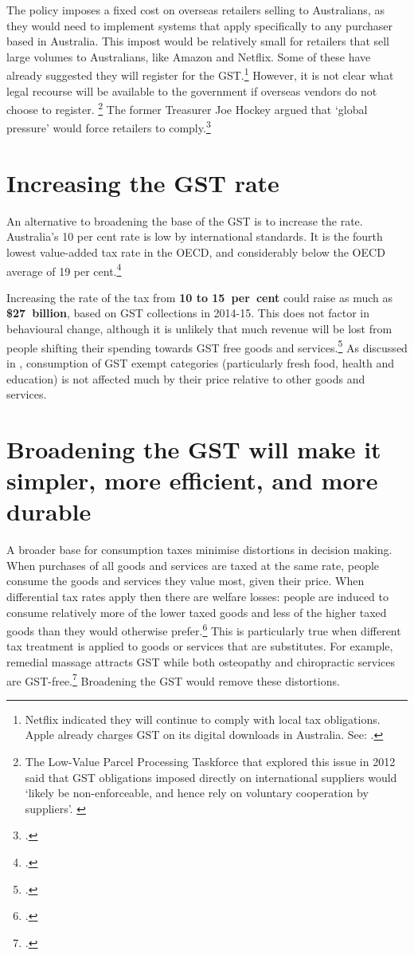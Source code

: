 The policy imposes a fixed cost on overseas retailers selling to Australians, as they would need to implement systems that apply specifically to any purchaser based in Australia. This impost would be relatively small for retailers that sell large volumes to Australians, like Amazon and Netflix. Some of these have already suggested they will register for the GST.\footnote{Netflix indicated they will continue to comply with local tax obligations. Apple already charges GST on its digital downloads in Australia. See: \textcite{Coorey2015-Netflix}.}  However, it is not clear what legal recourse will be available to the government if overseas vendors do not choose to register.%
\footnote{The Low-Value Parcel Processing Taskforce that explored this issue in 2012 said that GST obligations imposed directly on international suppliers would ‘likely be non-enforceable, and hence rely on voluntary cooperation by suppliers’. \textcite[][139]{Treasury2012c}}  The former Treasurer Joe Hockey argued that ‘global pressure’ would force retailers to comply.\footcite{Hockey2015--GST-import-threshold}  

\section{Increasing the GST rate}\label{sec:GST-2-2}
An alternative to broadening the base of the GST is to increase the rate. Australia’s 10 per cent rate is low by international standards. It is the fourth lowest value-added tax rate in the OECD, and considerably below the OECD average of 19 per cent.\footcite{OECDKoreaInstitutePublicFinance2014-Distributional-Effects-Consumption-Taxes}  

Increasing the rate of the tax from \textbf{10 to 15~per~cent} could raise as much as \textbf{\$27~billion}, based on GST collections in 2014-15. This does not factor in behavioural change, although it is unlikely that much revenue will be lost from people shifting their spending towards GST free goods and services.\footcite{KPMGEconotech2011-GST}  As discussed in , consumption of GST exempt categories (particularly fresh food, health and education) is not affected much by their price relative to other goods and services.

\section{Broadening the GST will make it simpler, more efficient, and more durable}\label{sec:GST-2-3}
A broader base for consumption taxes minimise distortions in decision making. When purchases of all goods and services are taxed at the same rate, people consume the goods and services they value most, given their price. When differential tax rates apply then there are welfare losses: people are induced to consume relatively more of the lower taxed goods and less of the higher taxed goods than they would otherwise prefer.\footcite{AtkinsonStiglitz1976}  This is particularly true when different tax treatment is applied to goods or services that are substitutes. For example, remedial massage attracts GST while both osteopathy and chiropractic services are GST-free.\footcite[][\S38-7]{GST-Act-1999}  Broadening the GST would remove these distortions.  

